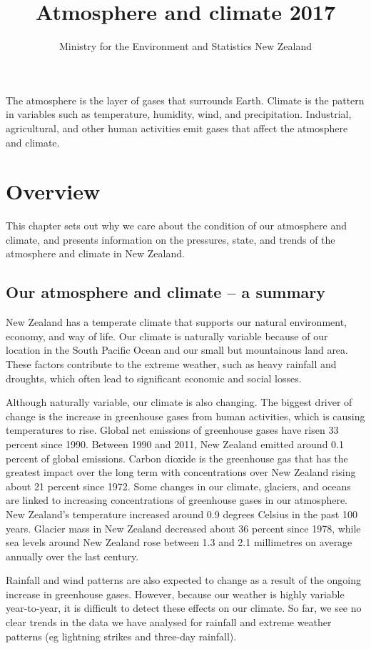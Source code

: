 \documentclass[11pt]{mfe-nzers} %
\title{Atmosphere and climate 2017}{Atmosphere and climate 2017}
\author{Ministry for the Environment and Statistics New Zealand}
\begin{document}
\maketitle
The atmosphere is the layer of gases that surrounds Earth. Climate is the pattern in variables such as temperature, humidity, wind, and precipitation. Industrial, agricultural, and other human activities emit gases that affect the atmosphere and climate.

\section{Overview}
This chapter sets out why we care about the condition of our atmosphere and climate, and presents information on the pressures, state, and trends of the atmosphere and climate in New Zealand.

\subsection{Our atmosphere and climate – a summary}
New Zealand has a temperate climate that supports our natural environment, economy, and way of life. Our climate is naturally variable because of our location in the South Pacific Ocean and our small but mountainous land area. These factors contribute to the extreme weather, such as heavy rainfall and droughts, which often lead to significant economic and social losses.

Although naturally variable, our climate is also changing. The biggest driver of change is the increase in greenhouse gases from human activities, which is causing temperatures to rise. Global net emissions of greenhouse gases have risen 33 percent since 1990. Between 1990 and 2011, New Zealand emitted around 0.1 percent of global emissions. Carbon dioxide is the greenhouse gas that has the greatest impact over the long term with concentrations over New Zealand rising about 21 percent since 1972. Some changes in our climate, glaciers, and oceans are linked to increasing concentrations of greenhouse gases in our atmosphere. New Zealand’s temperature increased around 0.9 degrees Celsius in the past 100 years. Glacier mass in New Zealand decreased about 36 percent since 1978, while sea levels around New Zealand rose between 1.3 and 2.1 millimetres on average annually over the last century.

Rainfall and wind patterns are also expected to change as a result of the ongoing increase in greenhouse gases. However, because our weather is highly variable year-to-year, it is difficult to detect these effects on our climate. So far, we see no clear trends in the data we have analysed for rainfall and extreme weather patterns (eg lightning strikes and three-day rainfall).
\end{document}
